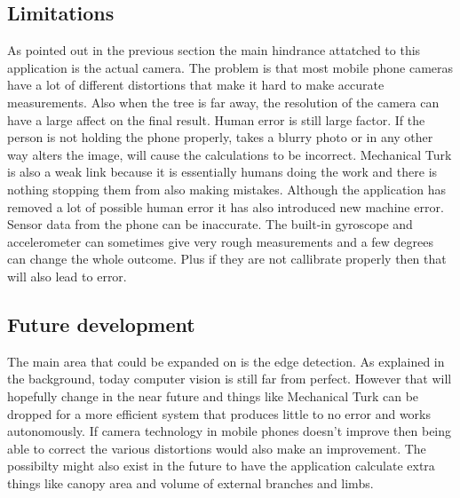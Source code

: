 \subsection{Limitations}
As pointed out in the previous section the main hindrance attatched to this application is the actual camera. The problem is that most mobile phone cameras have a lot of different distortions that make it hard to make accurate measurements. Also when the tree is far away, the resolution of the camera can have a large affect on the final result. Human error is still large factor. If the person is not holding the phone properly, takes a blurry photo or in any other way alters the image, will cause the calculations to be incorrect. Mechanical Turk is also a weak link because it is essentially humans doing the work and there is nothing stopping them from also making mistakes. Although the application has removed a lot of possible human error it has also introduced new machine error. Sensor data from the phone can be inaccurate. The built-in gyroscope and accelerometer can sometimes give very rough measurements and a few degrees can change the whole outcome. Plus if they are not callibrate properly then that will also lead to error.
\subsection{Future development}
The main area that could be expanded on is the edge detection. As explained in the background, today computer vision is still far from perfect. However that will hopefully change in the near future and things like Mechanical Turk can be dropped for a more efficient system that produces little to no error and works autonomously. If camera technology in mobile phones doesn't improve then being able to correct the various distortions would also make an improvement. The possibilty might also exist in the future to have the application calculate extra things like canopy area and volume of external branches and limbs.

